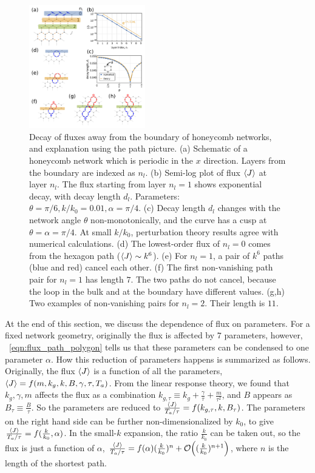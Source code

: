 \documentclass[
 preprint,
 preprintnumbers,
 amsmath,amssymb,
 aps,
 pre,
 longbibliography,
 10pt, twocolumn
]{revtex4-1}
\begin{document}
\begin{figure}[ht]
	\centering
	\includegraphics[width=0.45\textwidth]{5_path_decay.pdf}
    \caption{Decay of fluxes away from the boundary of honeycomb networks, and explanation using the path picture.
    (a) Schematic of a honeycomb network which is periodic in the $x$ direction. Layers from the boundary are indexed as $n_l$.
    (b) Semi-log plot of flux $\expval{J}$ at layer $n_l$. The flux starting from layer $n_l=1$ shows exponential decay, with decay length $d_l$. Parameters: $\theta = \pi/6, k/k_0 = 0.01, \alpha = \pi/4$.
    (c) Decay length $d_l$ changes with the network angle $\theta$ non-monotonically, and the curve has a cusp at $\theta = \alpha = \pi/4$. At small $k/k_0$, perturbation theory results agree with numerical calculations.
    (d) The lowest-order flux of $n_l=0$ comes from the hexagon path ($\expval{J}\sim k^6$).
    (e) For $n_l=1$, a pair of $k^6$ paths (blue and red) cancel each other. 
    (f) The first non-vanishing path pair for $n_l=1$ has length $7$. The two paths do not cancel, because the loop in the bulk and at the boundary have different values.
    (g,h) Two examples of non-vanishing pairs for $n_l=2$. Their length is $11$.
    }
    \label{fig:path_decay}
\end{figure}

At the end of this section, we discuss the dependence of flux on parameters. 
For a fixed network geometry, originally the flux is affected by $7$ parameters, however, \eqnname~\eqref{eqn:flux_path_polygon} tells us that these parameters can be condensed to one parameter $\alpha$. 
How this reduction of parameters happens is summarized as follows. 
Originally, the flux $\expval{J}$ is a function of all the parameters, $\expval{J} = f(m, k_g, k, B, \gamma, \tau, T_a)$.
From the linear response theory, we found that $k_g, \gamma, m$ affects the flux as a combination $k_{g,\tau} \equiv k_g + \frac{\gamma}{\tau} + \frac{m}{\tau^2}$, and $B$ appears as $B_\tau \equiv \frac{B}{\tau}$. So the parameters are reduced to $\frac{\expval{J}}{T_a/\tau} = f(k_{g,\tau}, k, B_\tau)$.
The parameters on the right hand side can be further non-dimensionalized by  $k_0$, to give $\frac{\expval{J}}{T_a/\tau} = f(\frac{k}{k_0}, \alpha)$.
In the small-$k$ expansion, the ratio $\frac{k}{k_0}$ can be taken out, so the flux is just a function of $\alpha$, $\frac{\expval{J}}{T_a/\tau} = f(\alpha) (\frac{k}{k_0})^n + \order{(\frac{k}{k_0})^{n+1}}$, where $n$ is the length of the shortest path.
\end{document}
